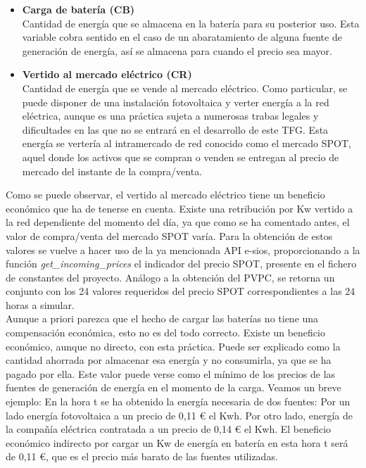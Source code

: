 \begin{itemize}
	\item \textbf{Carga de batería (CB)}\\Cantidad de energía que se almacena en la batería para su posterior uso. Esta variable cobra sentido en el caso de un abaratamiento de alguna fuente de generación de energía, así se almacena para cuando el precio sea mayor.
	\item \textbf{Vertido al mercado eléctrico (CR)}\\Cantidad de energía que se vende al mercado eléctrico. Como particular, se puede disponer de una instalación fotovoltaica y verter energía a la red eléctrica, aunque es una práctica sujeta a numerosas trabas legales y dificultades en las que no se entrará en el desarrollo de este \gls{TFG}. Esta energía se vertería al intramercado de red conocido como el mercado SPOT, aquel donde los activos que se compran o venden se entregan al precio de mercado del instante de la compra/venta.
\end{itemize}

Como se puede observar, el vertido al mercado eléctrico tiene un beneficio económico que ha de tenerse en cuenta. Existe una retribución por Kw vertido a la red dependiente del momento del día, ya que como se ha comentado antes, el valor de compra/venta del mercado SPOT varía. Para la obtención de estos valores se vuelve a hacer uso de la ya mencionada \gls{API} e-sios, proporcionando a la función \textit{get\_incoming\_prices} el indicador del precio SPOT, presente en el fichero de constantes del proyecto. Análogo a la obtención del \gls{PVPC}, se retorna un conjunto con los 24 valores requeridos del precio SPOT correspondientes a las 24 horas a simular.\\

Aunque a priori parezca que el hecho de cargar las baterías no tiene una compensación económica, esto no es del todo correcto. Existe un beneficio económico, aunque no directo, con esta práctica. Puede ser explicado como la cantidad ahorrada por almacenar esa energía y no consumirla, ya que se ha pagado por ella. Este valor puede verse como el mínimo de los precios de las fuentes de generación de energía en el momento de la carga. Veamos un breve ejemplo: En la hora t se ha obtenido la energía necesaria de dos fuentes: Por un lado energía fotovoltaica a un precio de 0,11 € el Kwh. Por otro lado, energía de la compañía eléctrica contratada a un precio de 0,14 € el Kwh. El beneficio económico indirecto por cargar un Kw de energía en batería en esta hora t será de 0,11 €, que es el precio más barato de las fuentes utilizadas.

